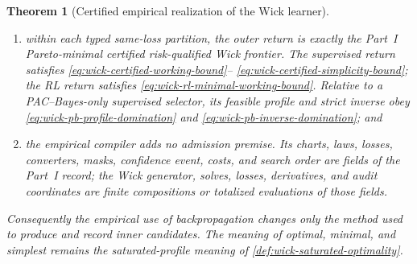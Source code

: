 \documentclass[11pt]{article}
\numberwithin{section}{part}
\theoremstyle{plain}
\newtheorem{theorem}{Theorem}[section]
\theoremstyle{definition}
\theoremstyle{remark}
\begin{document}
\begin{theorem}[Certified empirical realization of the Wick learner]
\begin{enumerate}[label=\textup{(\roman*)}]
\item within each typed same-loss partition, the outer return is exactly the
      Part~I Pareto-minimal certified risk-qualified Wick frontier.  The
      supervised return satisfies
      \eqref{eq:wick-certified-working-bound}--
      \eqref{eq:wick-certified-simplicity-bound}; the RL return satisfies
      \eqref{eq:wick-rl-minimal-working-bound}.  Relative to a PAC--Bayes-only
      supervised selector, its feasible profile and strict inverse obey
      \eqref{eq:wick-pb-profile-domination} and
      \eqref{eq:wick-pb-inverse-domination}; and
\item the empirical compiler adds no admission premise.  Its charts, laws,
      losses, converters, masks, confidence event, costs, and search order
      are fields of the Part~I record; the Wick generator, solves, losses,
      derivatives, and audit coordinates are finite compositions or
      totalized evaluations of those fields.
\end{enumerate}
Consequently the empirical use of backpropagation changes only the method
used to produce and record inner candidates.  The meaning of optimal,
minimal, and simplest remains the saturated-profile meaning of
\cref{def:wick-saturated-optimality}.
\end{theorem}
\end{document}
